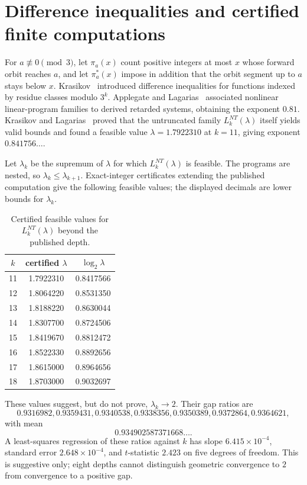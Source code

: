 \documentclass[11pt]{amsart}
\numberwithin{equation}{section}
\begin{document}
\section{Difference inequalities and certified finite computations}\label{sec:KL-finite}

For $a\not\equiv0\pmod3$, let $\pi_a(x)$ count positive integers at most $x$ whose forward orbit reaches $a$, and let $\pi_a^*(x)$ impose in addition that the orbit segment up to $a$ stays below $x$.  Krasikov~\cite{Krasikov1989} introduced difference inequalities for functions indexed by residue classes modulo $3^k$.  Applegate and Lagarias~\cite{ApplegateLagarias1995II} associated nonlinear linear-program families to derived retarded systems, obtaining the exponent $0.81$.  Krasikov and Lagarias~\cite{KrasikovLagarias2003} proved that the untruncated family $L_k^{NT}(\lambda)$ itself yields valid bounds and found a feasible value $\lambda=1.7922310$ at $k=11$, giving exponent $0.841756\ldots$.

Let $\lambda_k$ be the supremum of $\lambda$ for which $L_k^{NT}(\lambda)$ is feasible.  The programs are nested, so $\lambda_k\le\lambda_{k+1}$.  Exact-integer certificates extending the published computation give the following feasible values; the displayed decimals are lower bounds for $\lambda_k$.

\begin{table}[ht]
\centering
\caption{Certified feasible values for $L_k^{NT}(\lambda)$ beyond the published depth.}
\label{tab:lambda-ladder}
\begin{tabular}{c@{\qquad}c@{\qquad}c}
\toprule
$k$& certified $\lambda$&$\log_2\lambda$\\
\midrule
11&1.7922310&0.8417566\\
12&1.8064220&0.8531350\\
13&1.8188220&0.8630044\\
14&1.8307700&0.8724506\\
15&1.8419670&0.8812472\\
16&1.8522330&0.8892656\\
17&1.8615000&0.8964656\\
18&1.8703000&0.9032697\\
\bottomrule
\end{tabular}
\end{table}

These values suggest, but do not prove, $\lambda_k\to2$.  Their gap ratios are
\begin{equation}\label{eq:gap-ratios}
0.9316982,
0.9359431,
0.9340538,
0.9338356,
0.9350389,
0.9372864,
0.9364621,
\end{equation}
with mean
\begin{equation}\label{eq:ratio-mean}
0.934902587371668\ldots.
\end{equation}
A least-squares regression of these ratios against $k$ has slope $6.415\times10^{-4}$, standard error $2.648\times10^{-4}$, and $t$-statistic $2.423$ on five degrees of freedom.  This is suggestive only; eight depths cannot distinguish geometric convergence to $2$ from convergence to a positive gap.
\end{document}
